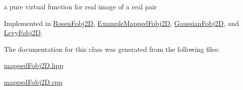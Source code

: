 a pure virtual function for real image of a real pair 



\-Implemented in \hyperlink{classRosenFobj2D_aa3b4b73aa5f8cfa9776b86b8df641c15}{\-Rosen\-Fobj2\-D}, \hyperlink{classExampleMappedFobj2D_a434c6a9f4b933698d9f54cae2a25377d}{\-Example\-Mapped\-Fobj2\-D}, \hyperlink{classGaussianFobj2D_a623ad551e1738a1f0ce3bac575c3b281}{\-Gaussian\-Fobj2\-D}, and \hyperlink{classLevyFobj2D_a2681e5ab1e51b953ec804e1d04da9b3d}{\-Levy\-Fobj2\-D}.



\-The documentation for this class was generated from the following files\-:\begin{DoxyCompactItemize}
\item 
\hyperlink{mappedFobj2D_8hpp}{mapped\-Fobj2\-D.\-hpp}\item 
\hyperlink{mappedFobj2D_8cpp}{mapped\-Fobj2\-D.\-cpp}\end{DoxyCompactItemize}
